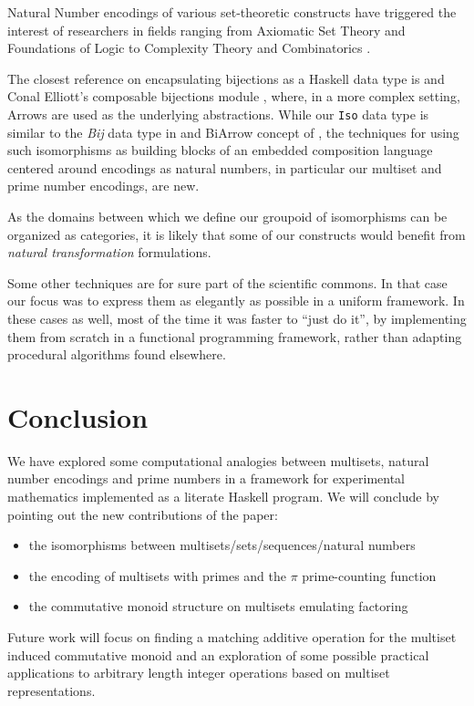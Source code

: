 \documentclass[]{INCLUDES/llncs}
\begin{document}
Natural Number encodings of various set-theoretic constructs have 
triggered the interest of researchers in fields ranging from 
Axiomatic Set Theory and Foundations of Logic to 
Complexity Theory and Combinatorics
\cite{finitemath,kaye07,abian78,avigad97,DBLP:journals/mlq/Kirby07}.

The closest reference on encapsulating bijections
as a Haskell data type is \cite{bijarrows} 
and Conal Elliott's composable
bijections module \cite{bijeliot},
where, in a more complex setting,
Arrows \cite{hughes:arrows} are used 
as the underlying abstractions.
While our {\tt Iso} data type is similar
to the {\em Bij} data type in \cite{bijeliot} and
BiArrow concept of \cite{bijarrows},
the techniques for using such isomorphisms
as building blocks of an embedded composition
language centered around encodings
as natural numbers, in particular our multiset and prime number 
encodings, are new.

As the domains between which we define our groupoid of
isomorphisms can be organized as categories,
it is likely that some of our constructs would benefit
from {\em natural transformation} \cite{matcat}
formulations.

Some other techniques are
for sure part of the scientific commons. 
In that
case our focus was to express them as
elegantly as possible in a uniform framework.
In these cases as well, most of the time
it was faster to ``just do it'', by implementing
them from scratch in a functional programming 
framework, rather than adapting procedural 
algorithms found elsewhere.

\section{Conclusion} \label{concl}
We have explored some computational analogies
between multisets, natural number encodings
and prime numbers in a framework for experimental
mathematics implemented as a literate Haskell
program. We will conclude by  pointing out
the new contributions of the paper:
\begin{itemize}
  \item the isomorphisms between multisets/sets/sequences/natural numbers
  \item the encoding of multisets with primes and the $\pi$
  prime-counting function
  \item the commutative monoid structure on multisets emulating factoring
\end{itemize}
Future work will focus on finding a matching additive operation for the
multiset induced commutative monoid and an exploration of some possible 
practical applications to arbitrary 
length integer operations based on multiset representations.
\end{document}
